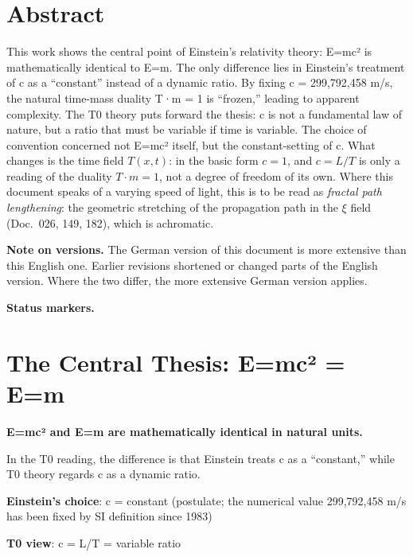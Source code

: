 \section*{Abstract}
		This work shows the central point of Einstein's relativity theory: E=mc² is mathematically identical to E=m. The only difference lies in Einstein's treatment of c as a ``constant'' instead of a dynamic ratio. By fixing c = 299,792,458 m/s, the natural time-mass duality T·m = 1 is ``frozen,'' leading to apparent complexity. The T0 theory puts forward the thesis: c is not a fundamental law of nature, but a ratio that must be variable if time is variable. The choice of convention concerned not E=mc² itself, but the constant-setting of c. What changes is the time field $T(x,t)$: in the basic form $c = 1$, and $c = L/T$ is only a reading of the duality $T\cdot m = 1$, not a degree of freedom of its own. Where this document speaks of a varying speed of light, this is to be read as \emph{fractal path lengthening}: the geometric stretching of the propagation path in the $\xi$ field (Doc.~026, 149, 182), which is achromatic.

	\medskip\noindent\textbf{Note on versions.} The German version of this document is more extensive than this English one. Earlier revisions shortened or changed parts of the English version. Where the two differ, the more extensive German version applies.

	\medskip\noindent\textbf{Status markers.}
	

	
	
	
	\section{The Central Thesis: E=mc² = E=m}
	
	\begin{tcolorbox}[colback=red!5!white,colframe=red!75!black,title=The Central Thesis]
		\textbf{E=mc² and E=m are mathematically identical in natural units.}
		
		In the T0 reading, the difference is that Einstein treats c as a ``constant,'' while T0 theory regards c as a dynamic ratio.
		
		\textbf{Einstein's choice}: c = constant (postulate; the numerical value 299,792,458 m/s has been fixed by SI definition since 1983)
		
		\textbf{T0 view}: c = L/T = variable ratio
	\end{tcolorbox}
	
